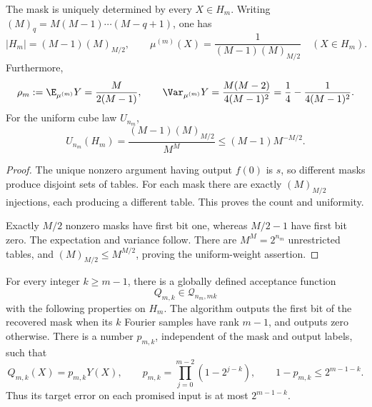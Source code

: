 \begin{lemma}\label{ian:simon-promise-count}
The mask is uniquely determined by every \(X\in H_m\).
Writing \((M)_q=M(M-1)\cdots(M-q+1)\), one has
\[
 |H_m|=(M-1)(M)_{M/2},
 \qquad
 \mu^{(m)}(X)=\frac1{(M-1)(M)_{M/2}}
 \quad(X\in H_m).
\]
Furthermore,
\[
 \rho_m:=\E_{\mu^{(m)}}Y=\frac{M}{2(M-1)},
 \qquad
 \Var_{\mu^{(m)}}Y
 =\frac{M(M-2)}{4(M-1)^2}
 =\frac14-\frac1{4(M-1)^2}.
\]
For the uniform cube law \(U_{n_m}\),
\[
 U_{n_m}(H_m)
 =\frac{(M-1)(M)_{M/2}}{M^M}
 \le (M-1)M^{-M/2}.
\]
\end{lemma}

\begin{proof}
The unique nonzero argument having output \(f(0)\) is \(s\), so different masks produce disjoint sets of tables. For each mask there are exactly \((M)_{M/2}\) injections, each producing a different table. This proves the count and uniformity.

Exactly \(M/2\) nonzero masks have first bit one, whereas \(M/2-1\) have first bit zero. The expectation and variance follow. There are \(M^M=2^{n_m}\) unrestricted tables, and \((M)_{M/2}\le M^{M/2}\), proving the uniform-weight assertion.
\end{proof}

\begin{lemma}\label{ian:simon-quantum-decoder}
For every integer \(k\ge m-1\), there is a globally defined acceptance function
\[
 Q_{m,k}\in\mathcal Q_{n_m,mk}
\]
with the following properties on \(H_m\). The algorithm outputs the first bit of the recovered mask when its \(k\) Fourier samples have rank \(m-1\), and outputs zero otherwise. There is a number \(p_{m,k}\), independent of the mask and output labels, such that
\[
 Q_{m,k}(X)=p_{m,k}Y(X),
 \qquad
 p_{m,k}=\prod_{j=0}^{m-2}(1-2^{j-k}),
 \qquad
 1-p_{m,k}\le 2^{m-1-k}.
\]
Thus its target error on each promised input is at most \(2^{m-1-k}\).
\end{lemma}

